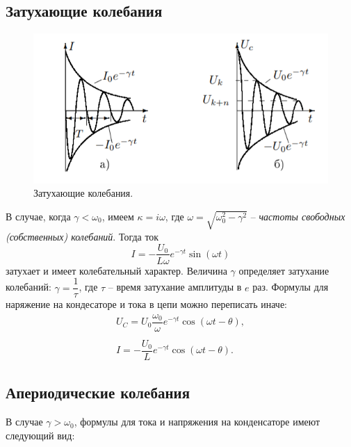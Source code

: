 \documentclass[a4paper,12pt]{article}
\begin{document}
\subsection*{Затухающие колебания}
\begin{figure}
\includegraphics[scale=0.6]{3.png}
\caption{Затухающие колебания.}
\vspace{-30pt}
\end{figure}
 В случае, когда $\gamma < \omega_0$, имеем $\kappa = i\omega$, где $\omega = \sqrt{\omega_0^2 - \gamma^2}$ -- \textit{частоты свободных (собственных) колебаний}. Тогда ток
 \begin{equation}
 I = -\dfrac{U_0}{L\omega}e^{-\gamma t}\sin(\omega t)
 \end{equation}
 затухает и имеет колебательный характер. Величина $\gamma$ определяет затухание колебаний: $\gamma = \dfrac{1}{\tau}$, где $\tau$ -- время затухание амплитуды в $e$ раз.
Формулы для наряжение на кондесаторе и тока в цепи можно переписать иначе:
\begin{equation}
\begin{array}{c}
U_C = U_0 \dfrac{\omega_0}{\omega}e^{-\gamma t} \cos(\omega t - \theta),\\
\\
I = -\dfrac{U_0}{L}e^{-\gamma t} \cos(\omega t - \theta).
\end{array}
\end{equation}
\subsection*{Апериодические колебания}
В случае $\gamma > \omega_0$, формулы для тока и напряжения на конденсаторе имеют следующий вид:
\end{document}
